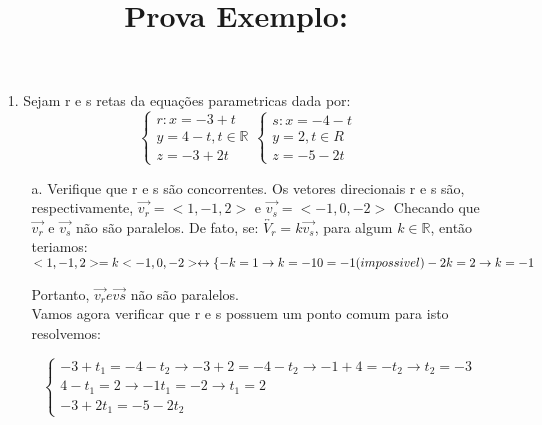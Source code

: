 \documentclass{article} %
\begin{document}
\title{Prova Exemplo:}

\begin{itemize}
    \item[1.] Sejam r e s retas da equações parametricas dada por:
    \begin{equation}
    \begin{cases}
        r:  x= -3 + t  \\
               y = 4-t, t \in \mathbb{R} \\
               z = -3 +2t 
    \end{cases} 
    \begin{cases}
        s:  x= -4 -t \\
            y = 2, t \in R \\
            z = -5 -2t 
    \end{cases}       
    \end{equation}

    \begin{itemize}
        \item[a. ] Verifique que r e s são concorrentes. 
        Os vetores direcionais r e s são, respectivamente, $\overrightarrow{v_r} = <1,-1,2> $ e
    $\overrightarrow{v_s} =  <-1,0,-2>$ 
    Checando que $\overrightarrow{v_r}$ e $\overrightarrow{v_s}$ não são paralelos.
    De fato, se:
    $\overleftrightarrow{V_r} = k \overrightarrow{v_s}$, para algum $k \in \mathbb{R}$, então teriamos: \\
    $<1,-1,2> = k <-1,0,-2> \leftrightarrow \{ -k = 1 \rightarrow k= -1 \\ 0 = - 1 (impossivel) \\ -2k = 2 \rightarrow{k= -1} $    
    
    Portanto, $\overrightarrow{v_r} e \overrightarrow{vs}$ não são paralelos. \\
    Vamos agora verificar que r e s possuem um ponto comum para isto resolvemos:

    \begin{equation}\label{eq}
    \begin{cases}
         -3 + t_1 = -4 -t_2 \rightarrow -3+2 = -4 -t_2 \rightarrow -1+4 = -t_2 \rightarrow t_2 = -3 \\
            4 - t_1 = 2 \rightarrow -1 t_1 = -2 \rightarrow t_1 = 2 \\
            -3 + 2t_1 = -5 -2t_2 


\end{cases}
\end{equation}
\end{itemize}
\end{itemize}
\end{document}
